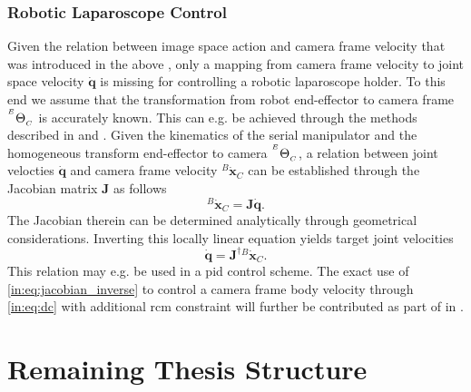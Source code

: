 
\subsubsection{Robotic Laparoscope Control}
\label{in:sec:robotic_laparoscope_control}
Given the relation between image space action and camera frame velocity that was introduced in the above , only a mapping from camera frame velocity to joint space velocity $\dot{\mathbf{q}}$ is missing for controlling a robotic laparoscope holder. To this end we assume that the transformation from robot end-effector to camera frame ${}^{^E}\Theta_{_C}$ is accurately known. This can e.g. be achieved through the methods described in  and . Given the kinematics of the serial manipulator and the homogeneous transform end-effector to camera ${}^{^E}\Theta_{_C}$, a relation between joint velocties $\dot{\mathbf{q}}$ and camera frame velocity ${}^B\dot{\mathbf{x}}_C$ can be established through the Jacobian matrix $\mathbf{J}$ as follows
\begin{equation}
    {}^B\dot{\mathbf{x}}_C = \mathbf{J} \dot{\mathbf{q}}.
\end{equation}
The Jacobian therein can be determined analytically through geometrical considerations. Inverting this locally linear equation yields target joint velocities
\begin{equation}
    \dot{\mathbf{q}} = \mathbf{J}^{\dagger}{}^B\dot{\mathbf{x}}_C.
    \label{in:eq:jacobian_inverse}
\end{equation}
This relation may e.g. be used in a \gls{pid} control scheme. The exact use of \eqref{in:eq:jacobian_inverse} to control a camera frame body velocity through \eqref{in:eq:dc} with additional \gls{rcm} constraint will further be contributed as part of  in .

\section{Remaining Thesis Structure}




